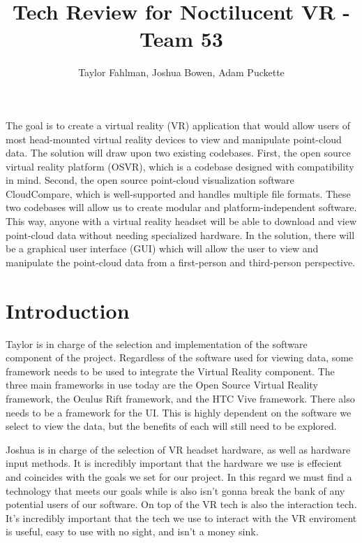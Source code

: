 \documentclass{article}
\begin{document}
\title {Tech Review for Noctilucent VR - Team 53}
\author {Taylor Fahlman, Joshua Bowen, Adam Puckette}

\maketitle

\abstract

The goal is to create a virtual reality (VR) application that would allow users of most head-mounted virtual reality devices to view and manipulate point-cloud data. 
The solution will draw upon two existing codebases. 
First, the open source virtual reality platform (OSVR), which is a codebase designed with compatibility in mind. 
Second, the open source point-cloud visualization software CloudCompare, which is well-supported and handles multiple file formats. 
These two codebases will allow us to create modular and platform-independent software. 
This way, anyone with a virtual reality headset will be able to download and view point-cloud data without needing specialized hardware.
In the solution, there will be a graphical user interface (GUI) which will allow the user to view and manipulate the point-cloud data from a first-person and third-person perspective. 

\newpage
\thispagestyle{empty}
\mbox{}


\section{Introduction}

Taylor is in charge of the selection and implementation of the software component of the project.
Regardless of the software used for viewing data, some framework needs to be used to integrate the Virtual Reality component.
The three main frameworks in use today are the Open Source Virtual Reality framework, the Oculus Rift framework, and the 
HTC Vive framework.
There also needs to be a framework for the UI. This is highly dependent on the software we select to view the data,
but the benefits of each will still need to be explored.

Joshua is in charge of the selection of VR headset hardware, as well as hardware input methods.
It is incredibly important that the hardware we use is effecient and coincides with the goals we set for our project.
In this regard we must find a technology that meets our goals while is also isn't gonna break the bank of any potential users of our software.
On top of the VR tech is also the interaction tech.
It's incredibly important that the tech we use to interact with the VR enviroment is useful, easy to use with no sight, and isn't a money sink.
\end{document}
